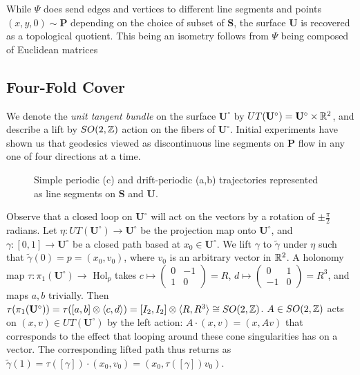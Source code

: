 \documentclass[]{article}
\def\bU{\mathbf{U}} \def\btU{\tilde{\bU}} \def\bUs{\bU^\circ}
\def\<{\langle} \def\>{\rangle}
\begin{document}
\begin{rem}
While $\Psi$ does send edges and vertices to different line segments and points $(x,y,0)\sim\mathbf{P}$ depending on the choice of subset of $\mathbf{S}$, the surface $\bU$ is recovered as a topological quotient. This being an isometry follows from $\Psi$ being composed of Euclidean matrices 
\end{rem}

\subsection{Four-Fold Cover}
We denote the \emph{unit tangent bundle} on the surface $\bUs$ by $UT(\bUs)=\bUs\times\RR^2$, and describe a lift by $SO(2,\mathbb{Z})$ action on the fibers of $\bUs$. Initial experiments have shown us that geodesics viewed as discontinuous line segments on $\mathbf{P}$ flow in any one of four directions at a time.
\begin{figure}[H]
\centering


\caption{Simple periodic (c) and drift-periodic (a,b) trajectories represented as line segments on $\mathbf{S}$ and $\mathbf{U}$.}
\label{fig:holonomypath}
\end{figure}
Observe that a closed loop on $\bUs$ will act on the vectors by a rotation of $\pm\frac{\pi}{2}$ radians. Let $\eta:UT(\bUs)\rightarrow\bUs$ be the projection map onto $\bUs$, and $\gamma:[0,1]\rightarrow\bUs$ be a closed path based at $x_0\in\bUs$. We lift $\gamma$ to $\tilde{\gamma}$ under $\eta$ such that $\tilde{\gamma}(0)=p=(x_0,v_0)$, where $v_0$ is an arbitrary vector in $\mathbb{R}^2$. A holonomy map $\tau:\pi_1(\bUs)\rightarrow$ Hol$_{p}$ takes $c\mapsto \begin{pmatrix}0 & -1\\ 1 & 0\end{pmatrix}=R$, $d\mapsto \begin{pmatrix}0 & 1\\ -1 & 0\end{pmatrix}=R^3$, and maps $a,b$ trivially. Then $\tau(\pi_1(\bUs))=\tau([a,b]\otimes\<c,d\>)=[I_2,I_2]\otimes\<R,R^3\>\cong SO(2,\ZZ)$. $A\in SO(2,\mathbb{Z})$ acts on $(x,v)\in UT(\bUs)$ by the left action: $A\cdot(x,v)=(x,Av)$ that corresponds to the effect that looping around these cone singularities has on a vector. The corresponding lifted path thus returns as $\tilde{\gamma}(1)=\tau([\gamma])\cdot(x_0,v_0)=(x_0,\tau([\gamma])v_0)$.
\end{document}
